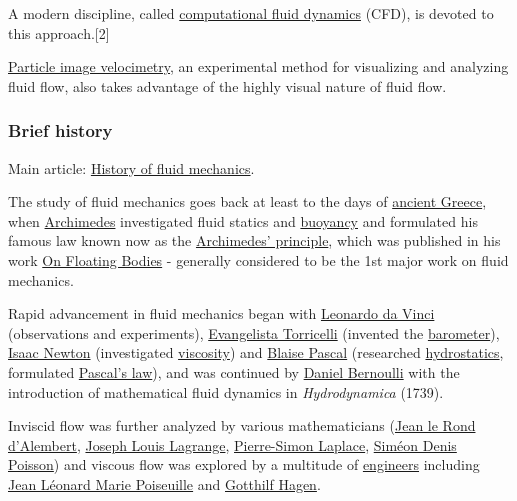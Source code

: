 \documentclass{article}
\begin{document}
A modern discipline, called \href{https://en.wikipedia.org/wiki/Computational_fluid_dynamics}{computational fluid dynamics} (CFD), is devoted to this approach.[2]

\href{https://en.wikipedia.org/wiki/Particle_image_velocimetry}{Particle image velocimetry}, an experimental method for visualizing and analyzing fluid flow, also takes advantage of the highly visual nature of fluid flow.

\subsubsection{Brief history}
Main article: \href{https://en.wikipedia.org/wiki/History_of_fluid_mechanics}{History of fluid mechanics}.

%
The study of fluid mechanics goes back at least to the days of \href{https://en.wikipedia.org/wiki/Ancient_Greece}{ancient Greece}, when \href{https://en.wikipedia.org/wiki/Archimedes}{Archimedes} investigated fluid statics and \href{https://en.wikipedia.org/wiki/Buoyancy}{buoyancy} and formulated his famous law known now as the \href{https://en.wikipedia.org/wiki/Archimedes'_principle}{Archimedes' principle}, which was published in his work \href{https://en.wikipedia.org/wiki/On_Floating_Bodies}{On Floating Bodies} - generally considered to be the 1st major work on fluid mechanics.

Rapid advancement in fluid mechanics began with \href{https://en.wikipedia.org/wiki/Leonardo_da_Vinci}{Leonardo da Vinci} (observations and experiments), \href{https://en.wikipedia.org/wiki/Evangelista_Torricelli}{Evangelista Torricelli} (invented the \href{https://en.wikipedia.org/wiki/Barometer}{barometer}), \href{https://en.wikipedia.org/wiki/Isaac_Newton}{Isaac Newton} (investigated \href{https://en.wikipedia.org/wiki/Viscosity}{viscosity}) and \href{https://en.wikipedia.org/wiki/Blaise_Pascal}{Blaise Pascal} (researched \href{https://en.wikipedia.org/wiki/Hydrostatics}{hydrostatics}, formulated \href{https://en.wikipedia.org/wiki/Pascal's_law}{Pascal's law}), and was continued by \href{https://en.wikipedia.org/wiki/Daniel_Bernoulli}{Daniel Bernoulli} with the introduction of mathematical fluid dynamics in \textit{Hydrodynamica} (1739).

%
Inviscid flow was further analyzed by various mathematicians (\href{https://en.wikipedia.org/wiki/Jean_le_Rond_d'Alembert}{Jean le Rond d'Alembert}, \href{https://en.wikipedia.org/wiki/Joseph_Louis_Lagrange}{Joseph Louis Lagrange}, \href{https://en.wikipedia.org/wiki/Pierre-Simon_Laplace}{Pierre-Simon Laplace}, \href{https://en.wikipedia.org/wiki/Sim%C3%A9on_Denis_Poisson}{Siméon Denis Poisson}) and viscous flow was explored by a multitude of \href{https://en.wikipedia.org/wiki/Engineers}{engineers} including \href{https://en.wikipedia.org/wiki/Jean_L%C3%A9onard_Marie_Poiseuille}{Jean Léonard Marie Poiseuille} and \href{https://en.wikipedia.org/wiki/Gotthilf_Hagen}{Gotthilf Hagen}.
\end{document}
